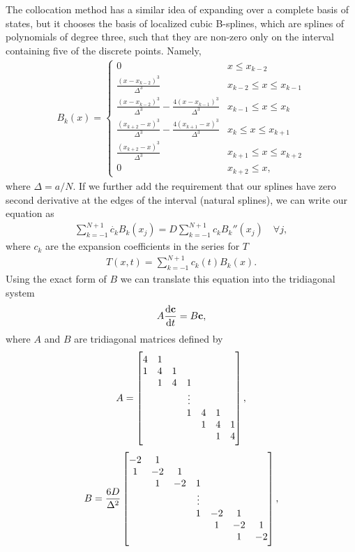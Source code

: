 \documentclass[10pt,a4paper,twocolumn]{article}
\renewcommand{\vec}[1]{\bm{\mathrm{#1}}}
\begin{document}
The collocation method has a similar idea of expanding over a complete basis of states, but it chooses the basis of localized cubic B-splines, which are splines of polynomials of degree three, such that they are non-zero only on the interval containing five of the discrete points. Namely,
%
\begin{align}
    B_k(x)=
    \begin{cases}
        0 & x \le x_{k-2}\\
        \frac{(x - x_{k-2})^3}{\Delta^3}  & x_{k-2} \le x \le x_{k-1}\\
        \frac{(x - x_{k-2})^3}{\Delta^3}  - \frac{4 (x - x_{k-1})^3}{\Delta^3} & x_{k-1} \le x \le x_{k}\\
        \frac{(x_{k+2} - x)^3}{\Delta^3}  - \frac{4 (x_{k+1} - x)^3}{\Delta^3} & x_{k} \le x \le x_{k+1}\\
        \frac{(x_{k+2} - x)^3}{\Delta^3}  & x_{k+1} \le x \le x_{k+2}\\
        0 & x_{k+2} \le x,
    \end{cases}
\end{align}
%
where $\Delta = a/N$. If we further add the requirement that our splines have zero second derivative at the edges of the interval (natural splines), we can write our equation as
%
\begin{align}
    \sum_{k=-1}^{N+1} \dot{c_k} B_k(x_j) = D \sum_{k=-1}^{N+1} c_k B_k''(x_j) \quad \forall j,
\end{align}
%
where $c_k$ are the expansion coefficients in the series for $T$
%
\begin{align}
    T(x, t) = \sum_{k=-1}^{N+1} c_k(t) B_k(x).
\end{align}
%
Using the exact form of $B$ we can translate this equation into the tridiagonal system
%
\begin{align}
    A \frac{\dif \vec{c}}{\dif t} = B \vec{c},
\end{align}
%
where $A$ and $B$ are tridiagonal matrices defined by
%
\begin{align}
    A =
    \begin{bmatrix}
    4 & 1 \cr
    1 & 4 & 1 \cr
      & 1 & 4 & 1 \cr
      &   &   & \vdots \cr
      &   &   & 1 & 4 & 1 & \cr
      &   &   &   & 1 & 4 & 1 \cr
      &   &   &   &   & 1 & 4
    \end{bmatrix},
\end{align}
%
\begin{align}
    B = \frac{6D}{\Delta^2}
    \begin{bmatrix}
    -2 & 1 \cr
    1 & -2 & 1 \cr
      & 1 & -2 & 1 \cr
      &   &   & \vdots \cr
      &   &   & 1 & -2 & 1 & \cr
      &   &   &   & 1 & -2 & 1 \cr
      &   &   &   &   & 1 & -2
    \end{bmatrix},
\end{align}
\end{document}
